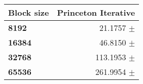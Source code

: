 \begin{tabular}{lr}\toprule
\textbf{Block size}  & \textbf{Princeton Iterative}\\\midrule
\textbf{8192}  & 21.1757 $\pm$ \\
\textbf{16384}  & 46.8150 $\pm$ \\
\textbf{32768}  & 113.1953 $\pm$ \\
\textbf{65536} & 261.9954 $\pm$ \\
\bottomrule
\end{tabular}
